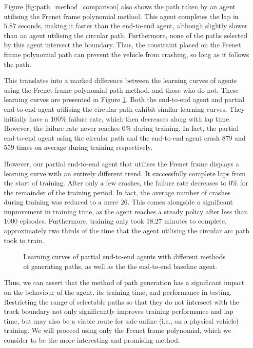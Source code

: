 Figure \ref{fig:path_method_comparison} also shows the path taken by an agent utilising the Frenet frame polynomial method.
This agent completes the lap in $5.87$ seconds, making it faster than the end-to-end agent, although slightly slower than an agent utilising the circular path.
Furthermore, none of the paths selected by this agent intersect the boundary.
Thus, the constraint placed on the Frenet frame polynomial path can prevent the vehicle from crashing, so long as it follows the path.

This translates into a marked difference between the learning curves of agents using the Frenet frame polynomial path method, and those who do not. 
These learning curves are presented in Figure \ref{fig:path_learning_curves}.
Both the end-to-end agent and partial end-to-end agent utilising the circular path exhibit similar learning curves.
They initially have a $100\%$ failure rate, which then decreases along with lap time. 
However, the failure rate never reaches $0\%$ during training.
In fact, the partial end-to-end agent using the circular path and the end-to-end agent crash $879$ and $559$ times on average during training respectively.

However, our partial end-to-end agent that utilises the Frenet frame displays a learning curve with an entirely different trend.
It successfully complete laps from the start of training.
After only a few crashes, the failure rate decreases to $0\%$ for the remainder of the training period.
In fact, the average number of crashes during training was reduced to a mere $26$.
This comes alongside a significant improvement in training time, as the agent reaches a steady policy after less than $1000$ episodes.
Furthermore, training only took $18.27$ minutes to complete, approximately two thirds of the time that the agent utilising the circular arc path took to train.

\begin{figure}[htb!]
    \centering
    
    \caption[Learning curves of partial end-to-end agents with different methods of generating paths]{Learning curves of partial end-to-end agents with different methods of generating paths, as well as the the end-to-end baseline agent.}
    \label{fig:path_learning_curves}
\end{figure}

Thus, we can assert that the method of path generation has a significant impact on the behaviour of the agent, its training time, and performance in testing.
Restricting the range of selectable paths so that they do not intersect with the track boundary not only significantly improves training performance and lap time, but may also be a viable route for safe online (i.e., on a physical vehicle) training.
We will proceed using only the Frenet frame polynomial, which we consider to be the more interesting and promising method.

